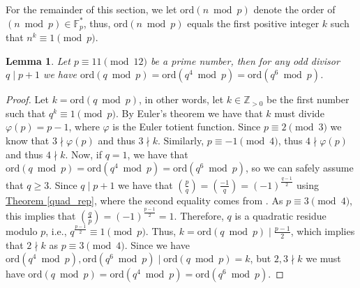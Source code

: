 \documentclass[openany, a4paper, 10pt]{book}
\theoremstyle{plain}
\theoremstyle{plain}
\theoremstyle{plain}
\newtheorem{lemma}[theorem]{Lemma}
\theoremstyle{definition}
\theoremstyle{plain}
\theoremstyle{definition}
\theoremstyle{remark}
\newcommand{\theoref}[1]{\hyperref[#1]{Theorem \ref{#1}}}
\begin{document}
For the remainder of this section, we let $\mathrm{ord}(n \bmod p)$ denote the order of $(n \bmod p) \in \mathbb F_p^*$, thus, $\mathrm{ord}(n \bmod p)$ equals the first positive integer $k$ such that $n^k \equiv 1 \pmod p$.

\begin{lemma}\label{orders_of_p}
    Let $p \equiv 11 \pmod {12}$ be a prime number, then for any odd divisor $q\mid p+1$ we have $\mathrm{ord}(q \bmod p) = \mathrm{ord}(q^4 \bmod p) = \mathrm{ord}(q^6 \bmod p)$.
\end{lemma}
\begin{proof}
    Let $k = \mathrm{ord}(q \bmod p)$, in other words, let $k \in \mathbb Z_{> 0}$ be the first number such that $q^k \equiv 1 \pmod p$.
    By Euler's theorem we have that $k$ must divide $\varphi(p)=p-1$, where $\varphi$ is the Euler totient function.
    Since $p \equiv 2 \pmod 3$ we know that $3 \nmid \varphi(p)$ and thus $3 \nmid k$.
    Similarly, $p \equiv -1 \pmod 4$, thus $4 \nmid \varphi(p)$ and thus $4 \nmid k$.
    Now, if $q=1$, we have that $\mathrm{ord}(q \bmod p) = \mathrm{ord}(q^4 \bmod p) = \mathrm{ord}(q^6 \bmod p)$, so we can safely assume that $q \geq 3$.
    Since $q\mid p+1$ we have that $\left( \frac{p}{q} \right) = \left( \frac{-1}{q} \right) = (-1)^{\frac{q-1}{2}}$ using \theoref{quad_rep}, where the second equality comes from \cite[p.~4]{quadrat_recip2}.
    As $p \equiv 3 \pmod 4$, this implies that $\left(\frac{q}{p}\right) = (-1)^{\frac{p-1}{2}} = 1$.
    Therefore, $q$ is a quadratic residue modulo $p$, i.e., $q^{\frac{p-1}{2}} \equiv 1 \pmod p$.
    Thus, $k = \mathrm{ord}(q \bmod p) \mid \frac{p-1}{2}$, which implies that $2 \nmid k$ as $p \equiv 3 \pmod 4$.
    Since we have $\mathrm{ord}(q^4 \bmod p),\mathrm{ord}(q^6 \bmod p) \mid \mathrm{ord}(q \bmod p)=k$, but $2,3 \nmid k$ we must have $\mathrm{ord}(q \bmod p) = \mathrm{ord}(q^4 \bmod p) = \mathrm{ord}(q^6 \bmod p)$.
\end{proof}
\end{document}
